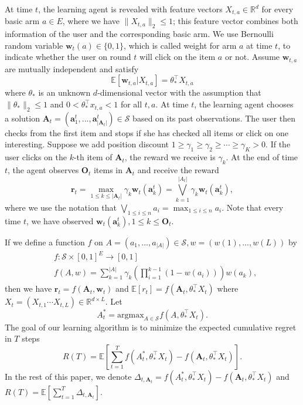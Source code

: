 \documentclass{article}
\newcommand{\bA}{\mathbf{A}}
\newcommand{\ba}{\mathbf{a}}
\newcommand{\bO}{\mathbf{O}}
\newcommand{\br}{\mathbf{r}}
\newcommand{\bw}{\mathbf{w}}
\newcommand{\cS}{\mathcal{S}}
\newcommand{\EE}{\mathbb{E}}
\newcommand{\RR}{\mathbb{R}}
\newcommand{\argmax}{\mathrm{argmax}}
\newcommand{\abs}[1]{\left| #1 \right|}
\newcommand{\norm}[1]{\| #1 \|}
\begin{document}
At time $t$, the learning agent is revealed with feature vectors $X_{t,a} \in \RR^d$ for every basic arm $a \in E$, where we have $\norm{X_{t,a}}_2 \leq 1$; this feature vector combines both information of the user and the corresponding basic arm. We use Bernoulli random variable $\bw_{t}(a) \in \{0,1\}$, which is called weight for arm $a$ at time $t$, to indicate whether the user on round $t$ will click on the item $a$ or not. Assume $\bw_{t,a}$ are mutually independent and satisfy
\begin{equation}
	\label{eq:expectation}
	\EE[\bw_{t,a} | X_{t,a}] = \theta_*^{\top} X_{t,a}
\end{equation}
where $\theta_*$ is an unknown $d$-dimensional vector with the assumption that $\norm{\theta_*}_2 \leq 1$ and $0 < \theta_*^{\top} x_{t,a} < 1$ for all $t, a$. At time $t$, the learning agent chooses a solution $\bA_t=(\ba_{1}^t,...,\ba_{\abs{\bA_t}}^t) \in \cS$ based on its past observations. The user then checks from the first item and stops if she has checked all items or click on one interesting. Suppose we add position discount $1 \geq\gamma_1 \geq \gamma_2\geq \cdots \geq \gamma_K>0$. If the user clicks on the $k$-th item of $\bA_t$, the reward we receive is $\gamma_k$. At the end of time $t$, the agent observes $\bO_t$ items in $\bA_t$ and receive the reward
$$
\br_t = \max_{1 \leq k \leq \abs{\bA_t}} \gamma_k \bw_t(\ba_k^t) = \bigvee_{k=1}^{\abs{A_t}} \gamma_k \bw_t(\ba_k^t),
$$
where we use the notation that $\bigvee_{1\leq i\leq n}a_i = \max_{1\leq i\leq n}a_i$. Note that every time $t$, we have observed $\bw_t(\ba_k^t), 1\leq k\leq\bO_t$. 

If we define a function $f$ on $A=(a_1,...,a_{\abs{A}}) \in \cS, w=(w(1),...,w(L))$ by
\begin{align*}
	& f : \cS \times [0,1]^E \to [0,1]\\
	& f(A,w) = \sum_{k=1}^{\abs{A}}\gamma_k (\prod_{i=1}^{k-1}(1 -w(a_i)))w(a_k),
\end{align*}
then we have $\br_t = f(\bA_t, \bw_t)$ and $\EE[r_t]=f(\bA_t,\theta_*^{\top}X_t)$ where $X_t=(X_{t,1} \cdots X_{t,L})\in\RR^{d\times L}$. Let 
$$
A_t^* = \argmax_{A\in \cS} f(A,\theta_*^{\top}X_t).
$$ 
The goal of our learning algorithm is to minimize the expected cumulative regret in $T$ steps
$$
R(T) = \EE[\sum_{t=1}^T f(A_t^*, \theta_*^{\top}X_t) - f(\bA_t, \theta_*^{\top}X_t)].
$$
In the rest of this paper, we denote $\Delta_{t,\bA_t} = f(A_t^*, \theta_*^{\top}X_t) - f(\bA_t, \theta_*^{\top}X_t)$ and $R(T) = \EE[\sum_{t=1}^T \Delta_{t,\bA_t}]$.
\end{document}
